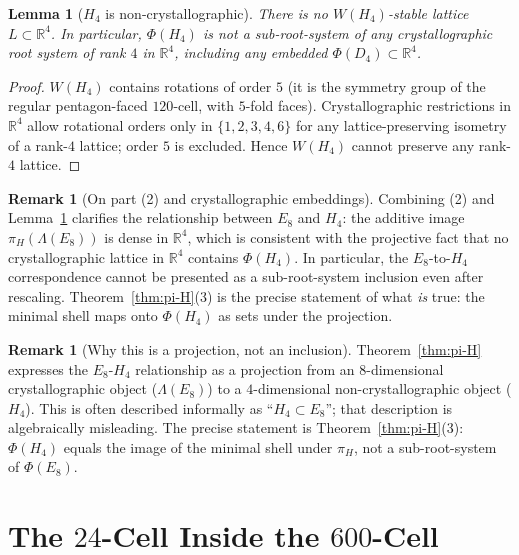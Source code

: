 \documentclass[11pt, a4paper]{amsart}
\newtheorem{lemma}[theorem]{Lemma}
\theoremstyle{definition}
\newtheorem{remark}[theorem]{Remark}
\newcommand{\R}{\mathbb{R}}
\begin{document}
\begin{lemma}[$H_4$ is non-crystallographic]
\label{lem:H4-noncrystallographic}
There is no $W(H_4)$-stable lattice $L \subset \R^4$. In particular,
$\Phi(H_4)$ is not a sub-root-system of any crystallographic root
system of rank $4$ in $\R^4$, including any embedded $\Phi(D_4) \subset
\R^4$.
\end{lemma}

\begin{proof}
$W(H_4)$ contains rotations of order $5$ (it is the symmetry group
of the regular pentagon-faced $120$-cell, with $5$-fold faces).
Crystallographic restrictions in $\R^4$ \cite[Theorem~6.4]{Humphreys}
allow rotational orders only in $\{1, 2, 3, 4, 6\}$ for any
lattice-preserving isometry of a rank-$4$ lattice; order $5$ is
excluded. Hence $W(H_4)$ cannot preserve any rank-$4$ lattice.
\end{proof}

\begin{remark}[On part (2) and crystallographic embeddings]
\label{rmk:density-noembedding}
Combining (2) and Lemma~\ref{lem:H4-noncrystallographic} clarifies
the relationship between $E_8$ and $H_4$: the additive image
$\pi_H(\Lambda(E_8))$ is dense in $\R^4$, which is consistent with
the projective fact that no crystallographic lattice in $\R^4$
contains $\Phi(H_4)$. In particular, the $E_8$-to-$H_4$
correspondence cannot be presented as a sub-root-system inclusion
even after rescaling. Theorem~\ref{thm:pi-H}(3) is the precise
statement of what \emph{is} true: the minimal shell maps onto
$\Phi(H_4)$ as sets under the projection.
\end{remark}

\begin{remark}[Why this is a projection, not an inclusion]
\label{rmk:projection-not-inclusion}
Theorem~\ref{thm:pi-H} expresses the $E_8$-$H_4$ relationship as a
projection from an $8$-dimensional crystallographic object
($\Lambda(E_8)$) to a $4$-dimensional non-crystallographic object
($H_4$). This is often described informally as ``$H_4 \subset
E_8$''; that description is algebraically misleading. The precise
statement is Theorem~\ref{thm:pi-H}(3): $\Phi(H_4)$ equals the
image of the minimal shell under $\pi_H$, not a sub-root-system of
$\Phi(E_8)$.
\end{remark}

\section{The $24$-Cell Inside the $600$-Cell}
\label{sec:24-600}
\end{document}
